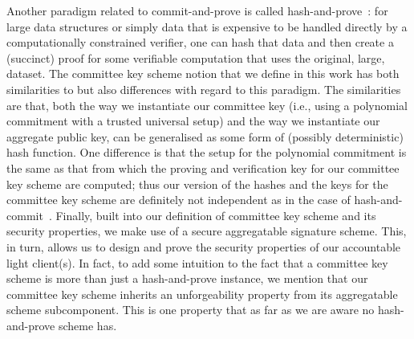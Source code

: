 \noindent Another paradigm related to commit-and-prove is called hash-and-prove~\cite{HP_paper}: for large data structures or simply data that is expensive to be 
handled directly by a computationally constrained verifier, one can hash that data and then create a (succinct) proof for some verifiable computation that uses 
the original, large, dataset. The committee key scheme notion that we define in this work has both similarities to but also differences with regard to this 
paradigm. The similarities are that, both the way we instantiate our committee key (i.e., using a polynomial commitment 
with a trusted universal setup) and the way we instantiate our aggregate public key, can be generalised as some form of (possibly deterministic) 
hash function. One difference is that the setup for the polynomial commitment is the same as that from which the proving and verification key for our committee key scheme are 
computed; thus our version of the hashes and the keys for the committee key scheme are definitely not independent as in the case of hash-and-commit~\cite{HP_paper}. Finally, 
built into our definition of committee key scheme and its security properties, we make use of a secure aggregatable signature scheme. This, in turn, allows us to design and 
prove the security properties of our accountable light client(s). In fact, to add some intuition to the fact that a committee key scheme is more than 
just a hash-and-prove instance, we mention that our committee key scheme inherits an unforgeability property from its aggregatable scheme subcomponent. 
This is one property that as far as we are aware no hash-and-prove scheme has. \\

